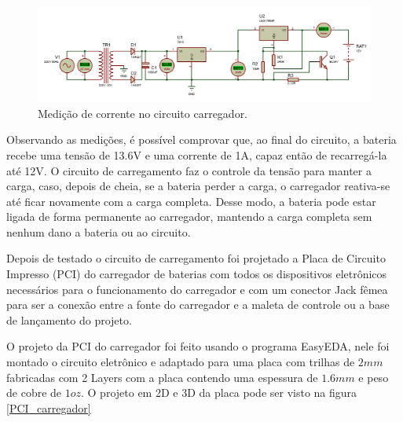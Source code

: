 \begin{figure}[!h]
	\centering
		\includegraphics[keepaspectratio=true,scale=0.5]{figuras/Medição - Corrente.PNG}
	\caption{Medição de corrente no circuito carregador.}
	\label{fig:bateriacorrente}
\end{figure}

\par Observando as medições, é possível comprovar que, ao final do circuito, a bateria recebe uma tensão de 13.6V e uma corrente de 1A, capaz então de recarregá-la até 12V. O circuito de carregamento faz o controle da tensão para manter a carga, caso, depois de cheia, se a bateria perder a carga, o carregador reativa-se até ficar novamente com a carga completa. Desse modo, a bateria pode estar ligada de forma permanente ao carregador, mantendo a carga completa sem nenhum dano a bateria ou ao circuito.

Depois de testado o circuito de carregamento foi projetado a Placa de Circuito Impresso (PCI) do carregador de baterias com todos os dispositivos eletrônicos necessários para o funcionamento do carregador e com um conector Jack fêmea para ser a conexão entre a fonte do carregador e a maleta de controle ou a base de lançamento do projeto.

O projeto da PCI do carregador foi feito usando o programa EasyEDA, nele foi montado o circuito eletrônico e adaptado para uma placa com trilhas de $2mm$ fabricadas com 2 Layers com a placa contendo uma espessura de $1.6 mm$ e peso de cobre de $1 oz$. O projeto em 2D e 3D da placa pode ser visto na figura \ref{PCI_carregador}

